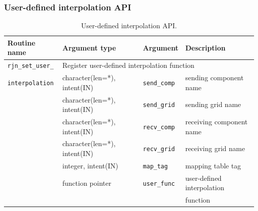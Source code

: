 \documentclass[11pt,a4paper]{report}
\begin{document}
\subsubsection{User-defined interpolation API}

\begin{table}[H]
\begin{center}
\caption{User-defined interpolation API.}
{\small
\label{table:rjn_api_user_intpl}
\begin{tabular}{llll}
\hline\hline
Routine name & Argument type & Argument & Description \\
\hline
 \texttt{rjn\_set\_user\_} & \multicolumn{3}{l}{Register user-defined
   interpolation function} \\
 \texttt{interpolation}
   & character(len=*), intent(IN)
     & \texttt{send\_comp} & sending component name\\
   & character(len=*), intent(IN)
     & \texttt{send\_grid} & sending grid name\\
   & character(len=*), intent(IN)
     & \texttt{recv\_comp} & receiving component name\\
   & character(len=*), intent(IN)
     & \texttt{recv\_grid} & receiving grid name\\
   & integer, intent(IN)
     & \texttt{map\_tag} & mapping table tag\\
   & function pointer
     & \texttt{user\_func} & user-defined interpolation\\
   &
     & & function\\
\hline\hline
\end{tabular}
}
\end{center}
\end{table}


%

\renewcommand{\chaptermark}[1]{%
\markboth{\appendixname \thechapter #1}{}}
\renewcommand{\sectionmark}[1]{%
\markright{\thesection\ #1 }}

\cleardoublepage

\pagestyle{empty}
\setcounter{page}{1}
\appendix




\listoffigures
\listoftables
\lstlistoflistings
\end{document}
